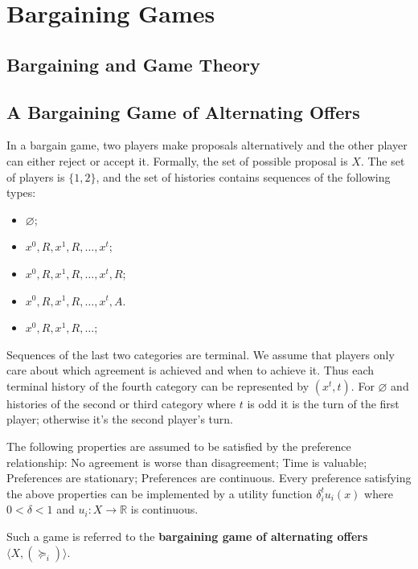 \documentclass[openany]{book}
\begin{document}
\chapter{Bargaining Games}
\section{Bargaining and Game Theory}

\section{A Bargaining Game of Alternating Offers}
In a bargain game, two players make proposals alternatively and the other player can either reject or accept it. Formally, the set of possible proposal is $X$. The set of players is $\{1,2\}$, and the set of histories contains sequences of the following types:
\begin{itemize}
\item $\varnothing$;
\item $x^0,R,x^1,R,\ldots,x^t$;
\item $x^0,R,x^1,R,\ldots,x^t,R$;
\item $x^0,R,x^1,R,\ldots,x^t,A$.
\item $x^0,R,x^1,R,\ldots$;
\end{itemize}
Sequences of the last two categories are terminal. We assume that players only care about which agreement is achieved and when to achieve it. Thus each terminal history of the fourth category can be represented by $(x^t,t)$. For $\varnothing$ and histories of the second or third category where $t$ is odd it is the turn of the first player; otherwise it's the second player's turn.

The following properties are assumed to be satisfied by the preference relationship: No agreement is worse than disagreement; Time is valuable; Preferences are stationary; Preferences are continuous. Every preference satisfying the above properties can be implemented by a utility function $\delta_i^tu_i(x)$ where $0<\delta<1$ and $u_i:X\rightarrow\mathbb{R}$ is continuous.

Such a game is referred to the \textbf{bargaining game of alternating offers} $\langle X,(\succeq_i)\rangle$.
\end{document}
